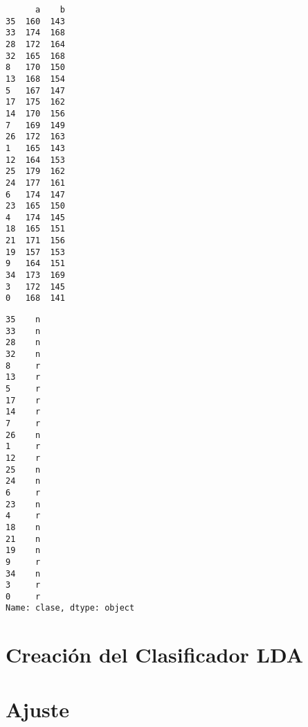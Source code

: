 \begin{verbatim}
      a    b
35  160  143
33  174  168
28  172  164
32  165  168
8   170  150
13  168  154
5   167  147
17  175  162
14  170  156
7   169  149
26  172  163
1   165  143
12  164  153
25  179  162
24  177  161
6   174  147
23  165  150
4   174  145
18  165  151
21  171  156
19  157  153
9   164  151
34  173  169
3   172  145
0   168  141
\end{verbatim}


\begin{Shaded}
\begin{Highlighting}[]
\end{Highlighting}
\end{Shaded}

\begin{verbatim}
35    n
33    n
28    n
32    n
8     r
13    r
5     r
17    r
14    r
7     r
26    n
1     r
12    r
25    n
24    n
6     r
23    n
4     r
18    n
21    n
19    n
9     r
34    n
3     r
0     r
Name: clase, dtype: object
\end{verbatim}

\section{Creación del Clasificador LDA}


\begin{Shaded}
\begin{Highlighting}[]
\end{Highlighting}
\end{Shaded}


\begin{Shaded}
\begin{Highlighting}[]
\OperatorTok{=}\OperatorTok{=}\OperatorTok{=}\NormalTok{)}
\end{Highlighting}
\end{Shaded}


\section{Ajuste}


\begin{Shaded}
\begin{Highlighting}[]
\end{Highlighting}
\end{Shaded}

